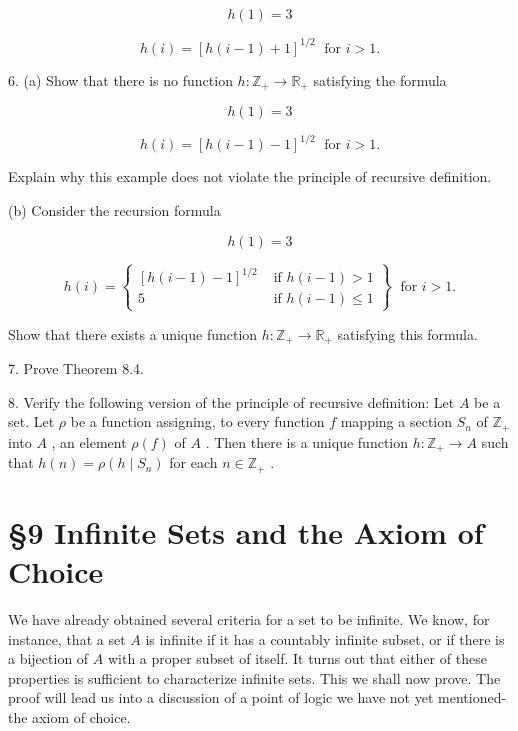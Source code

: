\documentclass[10pt]{article}
\begin{document}
\[
h\left( 1\right)  = 3
\]

\[
h\left( i\right)  = {\left\lbrack  h\left( i - 1\right)  + 1\right\rbrack  }^{1/2}\;\text{ for }i > 1.
\]

6. (a) Show that there is no function \(h : {\mathbb{Z}}_{ + } \rightarrow  {\mathbb{R}}_{ + }\) satisfying the formula

\[
h\left( 1\right)  = 3
\]

\[
h\left( i\right)  = {\left\lbrack  h\left( i - 1\right)  - 1\right\rbrack  }^{1/2}\;\text{ for }i > 1.
\]

Explain why this example does not violate the principle of recursive definition.

(b) Consider the recursion formula

\[
h\left( 1\right)  = 3
\]

\[
h\left( i\right)  = \left\{  \begin{array}{ll} {\left\lbrack  h\left( i - 1\right)  - 1\right\rbrack  }^{1/2} & \text{ if }h\left( {i - 1}\right)  > 1 \\  5 & \text{ if }h\left( {i - 1}\right)  \leq  1 \end{array}\right\}  \;\text{ for }i > 1.
\]

Show that there exists a unique function \(h : {\mathbb{Z}}_{ + } \rightarrow  {\mathbb{R}}_{ + }\) satisfying this formula.

7. Prove Theorem 8.4.

8. Verify the following version of the principle of recursive definition: Let \(A\) be a set. Let \(\rho\) be a function assigning, to every function \(f\) mapping a section \({S}_{n}\) of \({\mathbb{Z}}_{ + }\) into \(A\) , an element \(\rho \left( f\right)\) of \(A\) . Then there is a unique function \(h : {\mathbb{Z}}_{ + } \rightarrow  A\) such that \(h\left( n\right)  = \rho \left( {h \mid  {S}_{n}}\right)\) for each \(n \in  {\mathbb{Z}}_{ + }\) .

\section*{§9 Infinite Sets and the Axiom of Choice}

We have already obtained several criteria for a set to be infinite. We know, for instance, that a set \(A\) is infinite if it has a countably infinite subset, or if there is a bijection of \(A\) with a proper subset of itself. It turns out that either of these properties is sufficient to characterize infinite sets. This we shall now prove. The proof will lead us into a discussion of a point of logic we have not yet mentioned-the axiom of choice.
\end{document}
